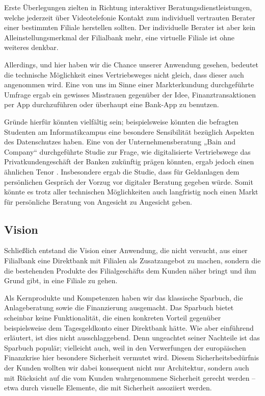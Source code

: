 	Erste Überlegungen zielten in Richtung interaktiver Beratungsdienstleistungen, welche jederzeit über Videotelefonie Kontakt zum individuell vertrauten Berater einer bestimmten Filiale herstellen sollten. Der individuelle Berater ist aber kein Alleinstellungsmerkmal der Filialbank mehr, eine virtuelle Filiale ist ohne weiteres denkbar.

	Allerdings, und hier haben wir die Chance unserer Anwendung gesehen, bedeutet die technische Möglichkeit eines Vertriebsweges nicht gleich, dass dieser auch angenommen wird. Eine von uns im Sinne einer Markterkundung durchgeführte Umfrage ergab ein gewisses Misstrauen gegenüber der Idee, Finanztransaktionen per App durchzuführen oder überhaupt eine Bank-App zu benutzen.
	
	Gründe hierfür könnten vielfältig sein; beispielsweise könnten die befragten Studenten am Informatikcampus eine besondere Sensibilität bezüglich Aspekten des Datenschutzes haben. Eine von der Unternehmensberatung „Bain and Company“ durchgeführte Studie zur Frage, wie digitalisierte Vertriebswege das Privatkundengeschäft der Banken zukünftig prägen könnten, ergab jedoch einen ähnlichen Tenor \citep{Bain12}. Insbesondere ergab die Studie, dass für Geldanlagen dem persönlichen Gespräch der Vorzug vor digitaler Beratung gegeben würde. Somit könnte es trotz aller technischen Möglichkeiten auch langfristig noch einen Markt für persönliche Beratung von Angesicht zu Angesicht geben.
 
\subsection{Vision}
	Schließlich entstand die Vision einer Anwendung, die nicht versucht, aus einer Filialbank eine Direktbank mit Filialen als Zusatzangebot zu machen, sondern die die bestehenden Produkte des Filialgeschäfts dem Kunden näher bringt und ihm Grund gibt, in eine Filiale zu gehen. 
	
	Als Kernprodukte und Kompetenzen haben wir das klassische Sparbuch, die Anlageberatung sowie die Finanzierung ausgemacht. Das Sparbuch bietet scheinbar keine Funktionalität, die einen konkreten Vorteil gegenüber beispielsweise dem Tagesgeldkonto einer Direktbank hätte. Wie aber einführend erläutert, ist dies nicht ausschlaggebend. Denn ungeachtet seiner Nachteile ist das Sparbuch populär; vielleicht auch, weil in den Verwerfungen der europäischen Finanzkrise hier besondere Sicherheit vermutet wird. Diesem Sicherheitsbedürfnis der Kunden wollten wir dabei konsequent nicht nur Architektur, sondern auch mit Rücksicht auf die vom Kunden wahrgenommene Sicherheit gerecht werden – etwa durch visuelle Elemente, die mit Sicherheit assoziiert werden.

